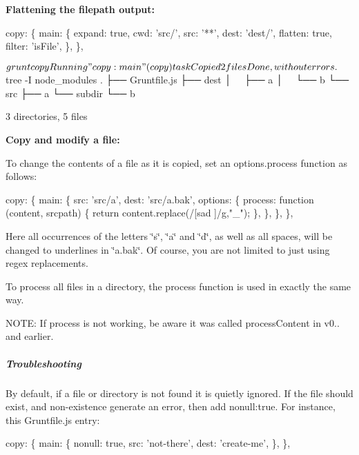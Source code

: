 {\bfseries Flattening the filepath output\+:}


\begin{DoxyCode}
copy: \{
  main: \{
    expand: true,
    cwd: 'src/',
    src: '**',
    dest: 'dest/',
    flatten: true,
    filter: 'isFile',
  \},
\},
\end{DoxyCode}



\begin{DoxyCode}
$ grunt copy
Running "copy:main" (copy) task
Copied 2 files

Done, without errors.
$ tree -I node\_modules
.
├── Gruntfile.js
├── dest
│   ├── a
│   └── b
└── src
    ├── a
    └── subdir
        └── b

3 directories, 5 files
\end{DoxyCode}


{\bfseries Copy and modify a file\+:}

To change the contents of a file as it is copied, set an {\ttfamily options.\+process} function as follows\+:


\begin{DoxyCode}
copy: \{
  main: \{
    src: 'src/a',
    dest: 'src/a.bak',
    options: \{
      process: function (content, srcpath) \{
        return content.replace(/[sad ]/g,"\_");
      \},
    \},
  \},
\},
\end{DoxyCode}


Here all occurrences of the letters \char`\"{}s\char`\"{}, \char`\"{}a\char`\"{} and \char`\"{}d\char`\"{}, as well as all spaces, will be changed to underlines in \char`\"{}a.\+bak\char`\"{}. Of course, you are not limited to just using regex replacements.

To process all files in a directory, the {\ttfamily process} function is used in exactly the same way.

N\+O\+TE\+: If {\ttfamily process} is not working, be aware it was called {\ttfamily process\+Content} in v0.. and earlier.

\subparagraph*{Troubleshooting}

By default, if a file or directory is not found it is quietly ignored. If the file should exist, and non-\/existence generate an error, then add {\ttfamily nonull\+:true}. For instance, this Gruntfile.\+js entry\+:


\begin{DoxyCode}
copy: \{
  main: \{
    nonull: true,
    src: 'not-there',
    dest: 'create-me',
  \},
\},
\end{DoxyCode}


